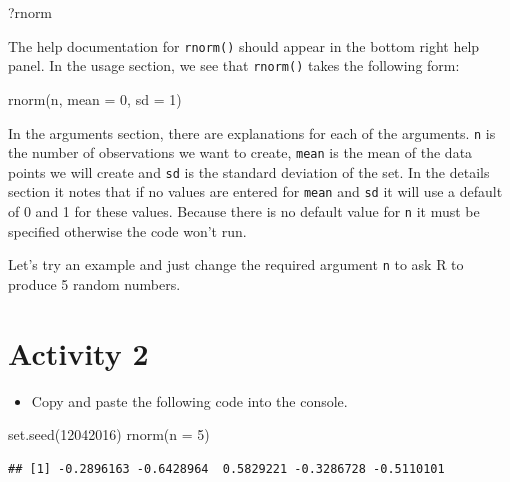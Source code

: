 \documentclass[
  oneside]{book}
\newenvironment{Shaded}{\begin{snugshade}}{\end{snugshade}}
\newcommand{\AttributeTok}[1]{\textcolor[rgb]{0.77,0.63,0.00}{#1}}
\newcommand{\DecValTok}[1]{\textcolor[rgb]{0.00,0.00,0.81}{#1}}
\newcommand{\FunctionTok}[1]{\textcolor[rgb]{0.00,0.00,0.00}{#1}}
\newcommand{\NormalTok}[1]{#1}
\providecommand{\tightlist}{%
  \setlength{\itemsep}{0pt}\setlength{\parskip}{0pt}}
\begin{document}
\begin{Shaded}
\begin{Highlighting}[]
\NormalTok{?rnorm}
\end{Highlighting}
\end{Shaded}

The help documentation for \texttt{rnorm()} should appear in the bottom right help panel. In the usage section, we see that \texttt{rnorm()} takes the following form:

\begin{Shaded}
\begin{Highlighting}[]
\FunctionTok{rnorm}\NormalTok{(n, }\AttributeTok{mean =} \DecValTok{0}\NormalTok{, }\AttributeTok{sd =} \DecValTok{1}\NormalTok{)}
\end{Highlighting}
\end{Shaded}

In the arguments section, there are explanations for each of the arguments. \texttt{n} is the number of observations we want to create, \texttt{mean} is the mean of the data points we will create and \texttt{sd} is the standard deviation of the set. In the details section it notes that if no values are entered for \texttt{mean} and \texttt{sd} it will use a default of 0 and 1 for these values. Because there is no default value for \texttt{n} it must be specified otherwise the code won't run.

Let's try an example and just change the required argument \texttt{n} to ask R to produce 5 random numbers.

\hypertarget{activity-2-1}{%
\section{Activity 2}\label{activity-2-1}}

\begin{itemize}
\tightlist
\item
  Copy and paste the following code into the console.
\end{itemize}

\begin{Shaded}
\begin{Highlighting}[]
\FunctionTok{set.seed}\NormalTok{(}\DecValTok{12042016}\NormalTok{)}
\FunctionTok{rnorm}\NormalTok{(}\AttributeTok{n =} \DecValTok{5}\NormalTok{)}
\end{Highlighting}
\end{Shaded}

\begin{verbatim}
## [1] -0.2896163 -0.6428964  0.5829221 -0.3286728 -0.5110101
\end{verbatim}
\end{document}
